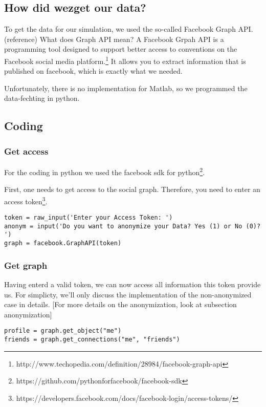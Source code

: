 
\subsection{How did wezget our data?} 

To get the data for our simulation, we used the so-called Facebook Graph API. (reference) What does Graph API mean? 
A Facebook Grpah API is a programming tool designed to support better access to conventions on the Facebook social media platform.\footnote{http://www.techopedia.com/definition/28984/facebook-graph-api} It allows you to extract information that is published on facebook, which is exactly what we needed. 

Unfortunately, there is no implementation for Matlab, so we programmed the data-fechting in python.

\subsection{Coding}

\subsubsection{Get access}

For the coding in python we used the facebook sdk for python\footnote{https://github.com/pythonforfacebook/facebook-sdk}. 

First, one needs to get access to the social graph. Therefore, you need to enter an access token\footnote{https://developers.facebook.com/docs/facebook-login/access-tokens/}. 

\begin{lstlisting} 
token = raw_input('Enter your Access Token: ')
anonym = input('Do you want to anonymize your Data? Yes (1) or No (0)? ')
graph = facebook.GraphAPI(token)

\end{lstlisting}

\subsubsection{Get graph}

Having enterd a valid token, we can now access all information this token provide us.  For simplicty, we'll only discuss the implementation of the non-anonymized case in details. [For more details on the anonymization, look at subsection anonymization]

\begin{lstlisting} 
profile = graph.get_object("me")
friends = graph.get_connections("me", "friends")
\end{lstlisting}

